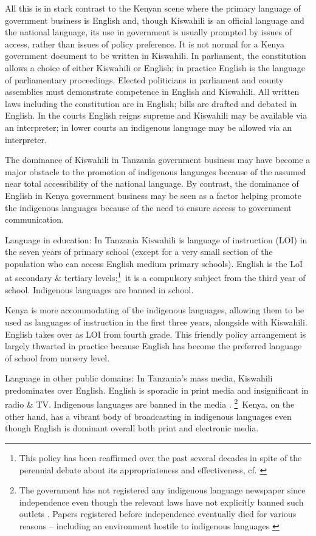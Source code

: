 \documentclass[output=paper,colorlinks,citecolor=brown]{langscibook}
\begin{document}
All this is in stark contrast to the Kenyan scene where the primary language of government business is English and, though Kiswahili is an official language and the national language, its use in government is usually prompted by issues of access, rather than issues of policy preference. It is not normal for a Kenya government document to be written in Kiswahili. In parliament, the constitution allows a choice of either Kiswahili or English; in practice English is the language of parliamentary proceedings. Elected politicians in parliament and county assemblies must demonstrate competence in English and Kiswahili.  All written laws including the constitution are in English; bills are drafted and debated in English. In the courts English reigns supreme and Kiswahili may be available via an interpreter; in lower courts an indigenous language may be allowed via an interpreter.

The dominance of Kiswahili in Tanzania government business may have become a major obstacle to the promotion of indigenous languages because of the assumed near total accessibility of the national language. By contrast, the dominance of English in Kenya government business may be seen as a factor helping promote the indigenous languages because of the need to ensure access to government communication.

Language in education: In Tanzania Kiswahili is language of instruction (LOI) in the seven years of primary school (except for a very small section of the population who can access English medium primary schools). English is the LoI at secondary \& tertiary levels;\footnote{This policy has been reaffirmed over the past several decades in spite of the perennial debate about its appropriateness and effectiveness, cf. \citep{Tanzania-Government1995, Tanzania-Government2014, QorroEtAl2012}}~it is a compulsory subject from the third year of school. Indigenous languages are banned in school.

Kenya is more accommodating of the indigenous languages, allowing them to be used as languages of instruction in the first three years, alongside with Kiswahili. English takes over as LOI from fourth grade. This friendly policy arrangement is largely thwarted in practice because English has become the preferred language of school from nursery level. 

Language in other public domains: In Tanzania’s mass media, Kiswahili predominates over English. English is sporadic in print media and insignificant in radio \& TV. Indigenous languages are banned in the media \citep{TCRA2005}. \footnote{The government has not registered any indigenous language newspaper since independence even though the relevant laws have not explicitly banned such outlets \citep[68--9]{Rugemalira2013}. Papers registered before independence eventually died for various reasons – including an environment hostile to indigenous languages \citep[92]{Madumulla2007}}~Kenya, on the other hand, has a vibrant body of broadcasting in indigenous languages even though English is dominant overall both print and electronic media. 
\end{document}
